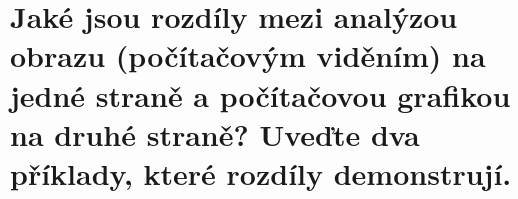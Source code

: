\section{Jaké jsou rozdíly mezi analýzou obrazu (počítačovým viděním) na jedné straně a počítačovou grafikou na 
druhé straně? Uveďte dva příklady, které rozdíly demonstrují.}